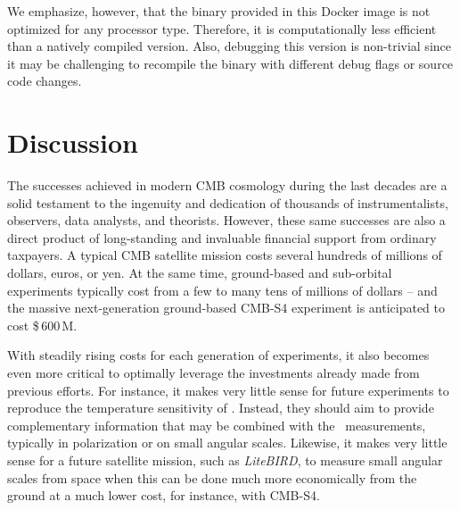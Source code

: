 \documentclass[twocolumn]{aa}
\begin{document}
We emphasize, however, that the binary provided in this Docker image is not optimized for any processor type. Therefore, it is computationally less efficient than a natively compiled version. Also, debugging this version is non-trivial since it may be challenging to recompile the binary with different debug flags or source code changes.

\section{Discussion}
\label{sec:conclusions}

The successes achieved in modern CMB cosmology during the last decades are a solid testament to the ingenuity and dedication of thousands of instrumentalists, observers, data analysts, and theorists. However, these same successes are also a direct product of long-standing and invaluable financial support from ordinary taxpayers. A typical CMB satellite mission costs several hundreds of millions of dollars, euros, or yen. At the same time, ground-based and sub-orbital experiments typically cost from a few to many tens of millions of dollars -- and the massive next-generation ground-based CMB-S4 experiment is anticipated to cost \$\,600\,M.

With steadily rising costs for each generation of experiments, it also becomes even more critical to optimally leverage the investments already made from previous efforts. For instance, it makes very little sense for future experiments to reproduce the temperature sensitivity of \Planck. Instead, they should aim to provide complementary information that may be combined with the \Planck\ measurements, typically in polarization or on small angular scales. Likewise, it makes very little sense for a future satellite mission, such as \textit{LiteBIRD}, to measure small angular scales from space when this can be done much more economically from the ground at a much lower cost, for instance, with CMB-S4.
\end{document}
